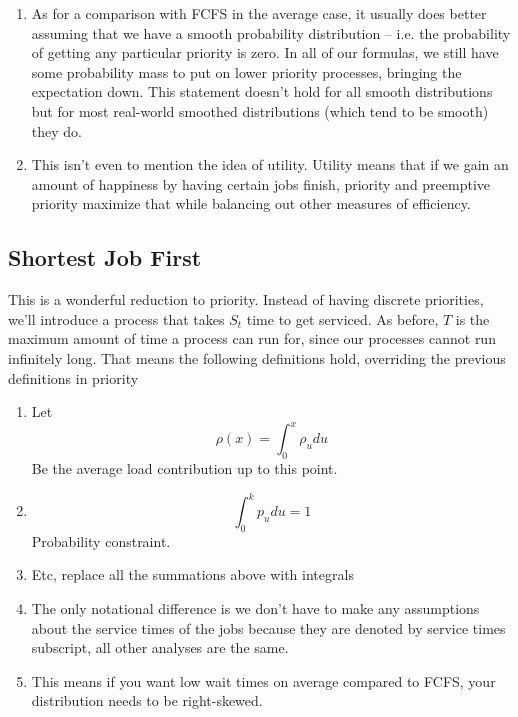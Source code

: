 \begin{enumerate}
  Meaning that we are tied to wait times and service times of all other processes.
  If we break down this equation, we see again if we have a lot of high priority jobs that don't contribute a lot to the load then our entire sum goes down.
  We won't make too many assumptions about the service time for a job because that would interfere with our analysis from FCFS where we left it as an expression.

  \item As for a comparison with FCFS in the average case, it usually does better assuming that we have a smooth probability distribution -- i.e. the probability of getting any particular priority is zero.
  In all of our formulas, we still have some probability mass to put on lower priority processes, bringing the expectation down.
  This statement doesn't hold for all smooth distributions but for most real-world smoothed distributions (which tend to be smooth) they do.

\item This isn't even to mention the idea of utility.
  Utility means that if we gain an amount of happiness by having certain jobs finish, priority and preemptive priority maximize that while balancing out other measures of efficiency.
\end{enumerate}


\subsection{Shortest Job First}
This is a wonderful reduction to priority.
Instead of having discrete priorities, we'll introduce a process that takes $S_t$ time to get serviced.
As before, $T$ is the maximum amount of time a process can run for, since our processes cannot run infinitely long.
That means the following definitions hold, overriding the previous definitions in priority

\begin{enumerate}
\item Let
  \[
  \rho(x) = \int_0^x \rho_u du
  \]
  Be the average load contribution up to this point.
\item
  \[
  \int_0^k p_u du = 1
  \] Probability constraint.
\item Etc, replace all the summations above with integrals
\item The only notational difference is we don't have to make any assumptions about the service times of the jobs because they are denoted by service times subscript, all other analyses are the same.
  \item This means if you want low wait times on average compared to FCFS, your distribution needs to be right-skewed.
\end{enumerate}

